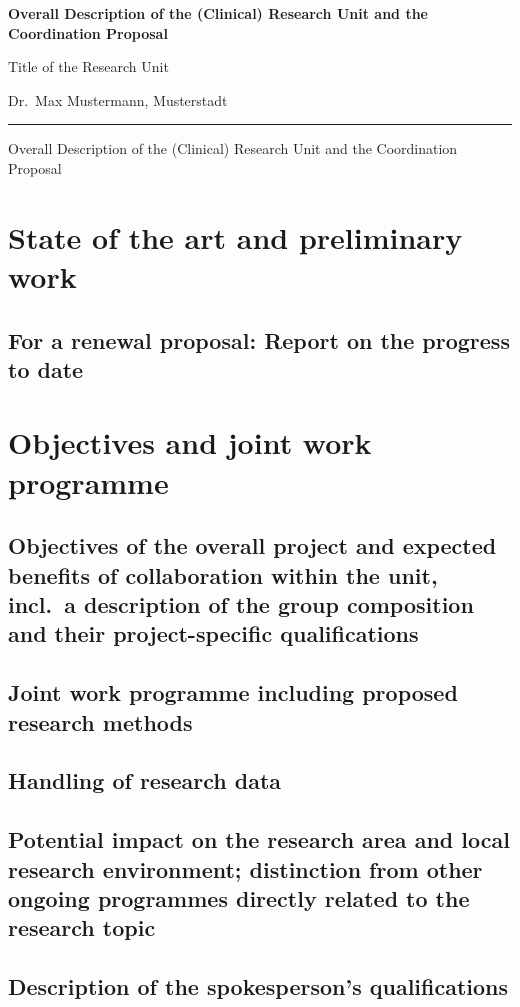 \documentclass[english, 53.02]{proposal}
\newcommand{\spokesperson}{Dr.\ Max Mustermann, Musterstadt}
\newcommand{\project}{Title of the Research Unit}
\begin{document}
{\raggedright{} \normalsize \bfseries
	Overall Description of the (Clinical) Research Unit and the Coordination Proposal \par
    \project{} \par
    \spokesperson{} \par
	\rule{\textwidth}{0.5pt} \par
	Overall Description of the (Clinical) Research Unit and the Coordination Proposal
}

\section{State of the art and preliminary work}

\subsection{For a renewal proposal: Report on the progress to date}


\section{Objectives and joint work programme}

\subsection{Objectives of the overall project and expected benefits of collaboration within the unit, incl.\ a description of the group composition and their project-specific qualifications}

\subsection{Joint work programme including proposed research methods}

\subsection{Handling of research data}

\subsection{Potential impact on the research area and local research environment; distinction from other ongoing programmes directly related to the research topic}

\subsection{Description of the spokesperson's qualifications}
\end{document}
